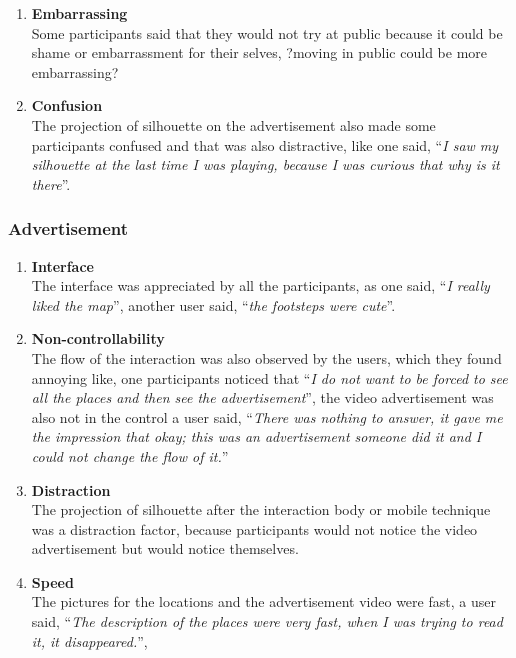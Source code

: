 \begin{enumerate}
\item	\textbf{Embarrassing}\\
Some participants said that they would not try at public because it could be shame or embarrassment for their selves, ?moving in public could be more embarrassing?

\item	\textbf{Confusion}\\
The projection of silhouette on the advertisement also made some participants confused and that was also distractive, like one said, ``\emph{I saw my silhouette at the last time I was playing, because I was curious that why is it there}''. 

\end{enumerate}


\subsubsection{Advertisement}

\begin{enumerate}
\item	\textbf{Interface}\\
The interface was appreciated by all the participants, as one said, ``\emph{I really liked the map}'', another user said, ``\emph{the footsteps were cute}''.

\item	\textbf{Non-controllability}\\
The flow of the interaction was also observed by the users, which they found annoying like, one participants noticed that ``\emph{I do not want to be forced to see all the places and then see the advertisement}'', the video advertisement was also not in the control a user said, ``\emph{There was nothing to answer, it gave me the impression that okay; this was an advertisement someone did it and I could not change the flow of it.}'' 

\item	\textbf{Distraction}\\
The projection of silhouette after the interaction body or mobile technique was a distraction factor, because participants would not notice the video advertisement but would notice themselves. 

\item	\textbf{Speed}\\
The pictures for the locations and the advertisement video were fast, a user said, ``\emph{The description of the places were very fast, when I was trying to read it, it disappeared.}'', 
\end{enumerate}

